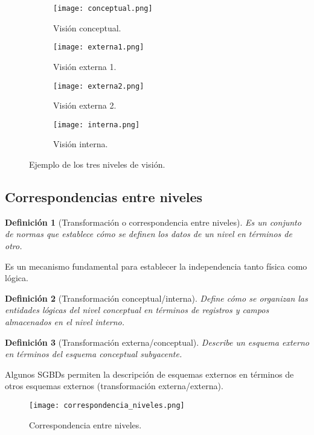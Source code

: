 \documentclass[12pt,spanish]{article}
\newtheorem{definition}{Definición}
\numberwithin{definition}{subsection}
\begin{document}
\begin{figure}[H]
\centering
\begin{subfigure}[b]{0.75\textwidth}
\texttt{[image: conceptual.png]}
\caption{Visión conceptual.}
\end{subfigure}

	\begin{subfigure}[b]{0.4\textwidth}
		\texttt{[image: externa1.png]}
		\caption{Visión externa 1.}
	\end{subfigure}
\quad
	\begin{subfigure}[b]{0.45\textwidth}
		\texttt{[image: externa2.png]}
		\caption{Visión externa 2.}
	\end{subfigure}

\begin{subfigure}[b]{0.75\textwidth}
\texttt{[image: interna.png]}
\caption{Visión interna.}
\end{subfigure}
\caption{Ejemplo de los tres niveles de visión.}

\end{figure}


\subsection{Correspondencias entre niveles}

\begin{definition}[Transformación o correspondencia entre niveles]
Es un conjunto de normas que establece cómo se definen los datos de un nivel en términos de otro.
\end{definition}
Es un mecanismo fundamental para establecer la independencia tanto física como lógica.

\begin{definition}[Transformación conceptual/interna]
Define cómo se organizan las entidades lógicas del nivel conceptual en términos de registros y campos almacenados en el nivel interno.
\end{definition}

\begin{definition}[Transformación externa/conceptual]
Describe un esquema externo en términos del esquema conceptual subyacente.
\end{definition}

Algunos SGBDs permiten la descripción de esquemas externos en términos de otros esquemas externos (transformación externa/externa).

\begin{figure}[H]
\centering
\texttt{[image: correspondencia\_niveles.png]}
\caption{Correspondencia entre niveles.}
\end{figure}
\end{document}
